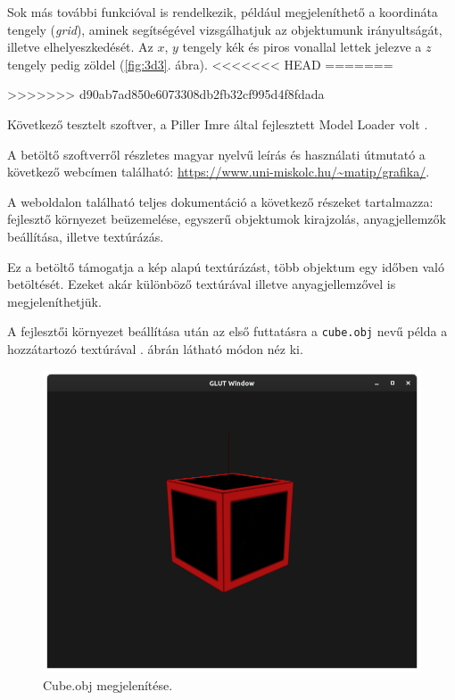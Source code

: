Sok más további funkcióval is rendelkezik, például megjeleníthető a koordináta tengely (\textit{grid}), aminek segítségével vizsgálhatjuk az objektumunk irányultságát, illetve elhelyeszkedését. Az $x$, $y$ tengely kék és piros vonallal lettek jelezve a $z$ tengely pedig zöldel  (\ref{fig:3d3}. ábra).
<<<<<<< HEAD
\newpage
=======

>>>>>>> d90ab7ad850e6073308db2fb32cf995d4f8fdada

Következő tesztelt szoftver, a Piller Imre által fejlesztett Model Loader volt \cite{imre2020model}.

A betöltő szoftverről részletes magyar nyelvű leírás és használati útmutató a következő webcímen található: \url{https://www.uni-miskolc.hu/~matip/grafika/}.

A weboldalon található teljes dokumentáció a következő részeket tartalmazza: fejlesztő környezet beüzemelése, egyszerű objektumok kirajzolás, anyagjellemzők beállítása, illetve textúrázás.

Ez a betöltő támogatja a kép alapú textúrázást, több objektum egy időben való betöltését. Ezeket akár különböző textúrával illetve anyagjellemzővel is megjeleníthetjük.

A fejlesztői környezet beállítása után az első futtatásra a \texttt{cube.obj} nevű példa a hozzátartozó textúrával . ábrán látható módon néz ki.

\begin{figure}[h]
\centering
\includegraphics[width=\textwidth]{images/Model_loader.png}
\caption{Cube.obj megjelenítése.}
\label{fig:model1}
\end{figure}


